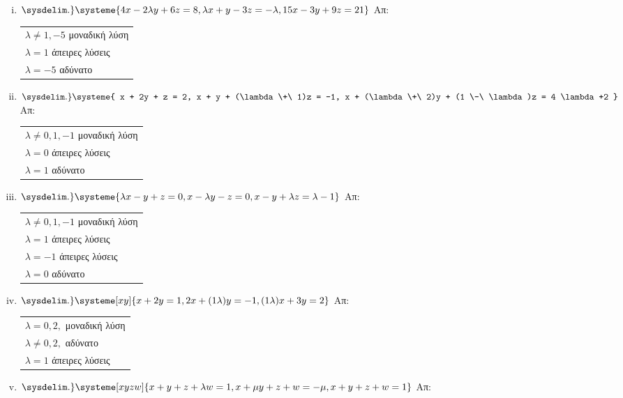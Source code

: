 \begin{enumerate}
	\begin{enumerate}[i)]
		\setlength{\itemsep}{\baselineskip}
\item $\sysdelim.\} \systeme{4x-2\lambda y + 6z = 8, \lambda x + y -3z = -\lambda, 15x -3y + 9z = 21}$ \hfill Απ: \begin{tabular}{l}
		$\lambda \neq 1,-5 $ μοναδική λύση \\
		$\lambda = 1 $ άπειρες λύσεις \\
		$\lambda =-5 $ αδύνατο
	\end{tabular}


\item $ \sysdelim.\} \systeme{
x + 2y + z = 2, 
x + y + (\lambda  \+\ 1)z = -1, 
x + (\lambda  \+\ 2)y + (1 \-\ \lambda)z = 4 \lambda +2
} $ \hfill Απ: \begin{tabular}{l}
	$ \lambda \neq 0, 1, -1 $ μοναδική λύση \\
	$ \lambda = 0 $ άπειρες λύσεις \\
	$ \lambda = 1 $ αδύνατο 
\end{tabular} 

\item $ \sysdelim.\} \systeme{
\lambda x - y + z = 0,
x - \lambda y - z = 0, 
x - y + \lambda z = \lambda - 1
} $ \hfill Απ: \begin{tabular}{l}
	$ \lambda \neq 0, 1, -1 $ μοναδική λύση \\
	$ \lambda = 1$ άπειρες λύσεις \\
	$ \lambda = -1 $ άπειρες λύσεις \\
	$ \lambda = 0 $ αδύνατο
\end{tabular} 

\item $ \sysdelim.\} \systeme[xy]{
x + 2y = 1,
2x+(1 \- \lambda)y = -1, 
(1 \- \lambda)x + 3y = 2
} $ \hfill Απ: \begin{tabular}{l}
	$ \lambda = 0, 2, $ μοναδική λύση \\
	$ \lambda \neq 0, 2, $ αδύνατο \\
	$ \lambda = 1$ άπειρες λύσεις \\
\end{tabular} 

\item $ \sysdelim.\} \systeme[xyzw]{
    x + y + z + \lambda w = 1,
    x + \mu y + z + w = - \mu, 
    x + y + z + w = 1
}$ \hfill Απ:   
  

	\end{enumerate}

\end{enumerate}


